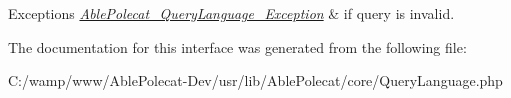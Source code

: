 \begin{DoxyExceptions}{Exceptions}
{\em \hyperlink{class_able_polecat___query_language___exception}{Able\+Polecat\+\_\+\+Query\+Language\+\_\+\+Exception}} & if query is invalid. \\
\hline
\end{DoxyExceptions}


The documentation for this interface was generated from the following file\+:\begin{DoxyCompactItemize}
\item 
C\+:/wamp/www/\+Able\+Polecat-\/\+Dev/usr/lib/\+Able\+Polecat/core/Query\+Language.\+php\end{DoxyCompactItemize}
